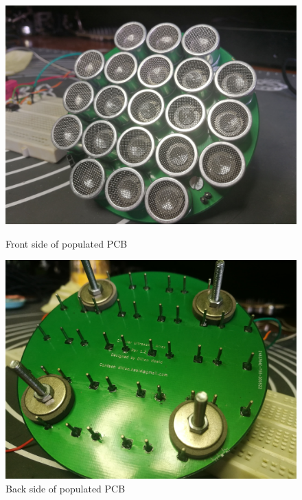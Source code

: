 \begin{figure}[ht!]
\centering

    \begin{minipage}{0.49\textwidth}
    \centering
    \includegraphics[width= \textwidth]{Figures/Implementation/TransducerArray/pcbdoneFrontdiag.jpg}
    \caption{Front side of populated PCB}
    \label{fig:pcbfront}
    \end{minipage}\hfill
    \begin{minipage}{0.49\textwidth}
    \centering
    \includegraphics[width= \textwidth]{Figures/Implementation/TransducerArray/pcbdoneBackdiag.jpg}
    \caption{Back side of populated PCB}
    \label{fig:pcbback}
    \end{minipage}
    
\end{figure}

